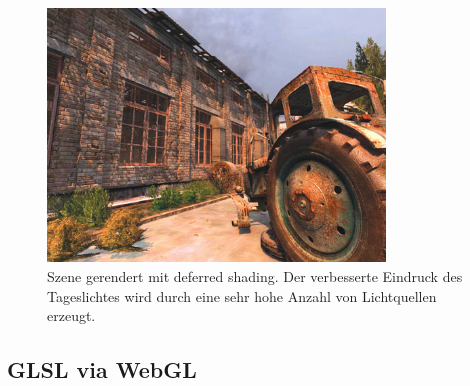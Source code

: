 \begin{figure}[H]
    \centering
    \includegraphics[width=0.8\textwidth]{images/deferred_shading_on.jpg}
    \caption{Szene gerendert mit  deferred shading. Der verbesserte  Eindruck des Tageslichtes wird durch eine sehr hohe Anzahl von Lichtquellen erzeugt.} %
    \label{fig:defferedshading}
\end{figure}



\subsection{GLSL via WebGL}
